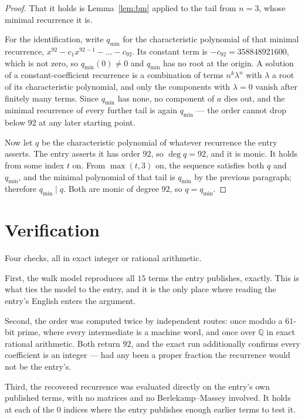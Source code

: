 \documentclass[11pt,a4paper]{article}
\theoremstyle{plain}
\theoremstyle{definition}
\begin{document}
\begin{proof}
That it holds is Lemma~\ref{lem:bm} applied to the tail from $n=3$, whose minimal
recurrence it is.

For the identification, write $q_{\min}$ for the characteristic polynomial of that minimal
recurrence, $x^{92}-c_1x^{92-1}-\dots-c_{92}$. Its constant term is
$-c_{92}=358848921600$, which is not zero, so $q_{\min}(0)\neq0$ and $q_{\min}$ has no
root at the origin. A solution of a constant-coefficient recurrence is a combination of terms
$n^{k}\lambda^{n}$ with $\lambda$ a root of its characteristic polynomial, and only the
components with $\lambda=0$ vanish after finitely many terms. Since $q_{\min}$ has none, no
component of $a$ dies out, and the minimal recurrence of every further tail is again
$q_{\min}$ --- the order cannot drop below $92$ at any later starting point.

Now let $q$ be the characteristic polynomial of whatever recurrence the entry asserts. The
entry asserts it has order $92$, so $\deg q=92$, and it is monic. It holds from some
index $t$ on. From $\max(t,3)$ on, the sequence satisfies both $q$ and $q_{\min}$, and
the minimal polynomial of that tail is $q_{\min}$ by the previous paragraph; therefore
$q_{\min}\mid q$. Both are monic of degree $92$, so $q=q_{\min}$.
\end{proof}

\section{Verification}

Four checks, all in exact integer or rational arithmetic.

First, the walk model reproduces all $15$ terms the entry publishes, exactly. This is
what ties the model to the entry, and it is the only place where reading the entry's English
enters the argument.

Second, the order was computed twice by independent routes: once modulo a $61$-bit prime, where
every intermediate is a machine word, and once over $\mathbb{Q}$ in exact rational arithmetic.
Both return $92$, and the exact run additionally confirms every coefficient is an integer
--- had any been a proper fraction the recurrence would not be the entry's.

Third, the recovered recurrence was evaluated directly on the entry's own published terms, with
no matrices and no Berlekamp--Massey involved. It holds at each of the $0$ indices where
the entry publishes enough earlier terms to test it.
\end{document}
